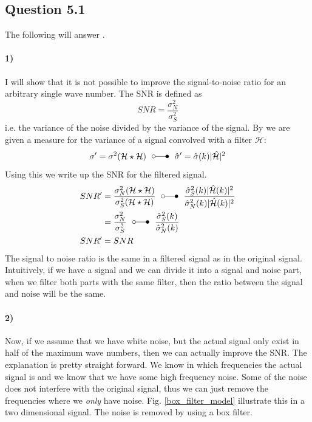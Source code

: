 \documentclass[a4paper, 10pt, final]{article}
\title{\mytitle}
\subtitle{\mysubtitle}
\author{\myauthor{} - \mymail}
\date{\mydate}
\begin{document}
\maketitle

\subsection*{Question 5.1}
The following will answer \citep[Excercise 11.6, p. 329]{jahne-digital}.

\paragraph{1)}
I will show that it is not possible to improve the signal-to-noise ratio
for an arbitrary single wave number. The SNR is defined as
\begin{equation}
    SNR = \frac{\sigma^2_N}{\sigma^2_S}
\end{equation}
i.e. the variance of the noise divided by the variance of the signal. By
\citep[Eq. (4.38)]{jahne-digital} we are given a measure for the
variance of a signal convolved with a filter $\mathcal{H}$:
\begin{equation}
    \mathbf{\sigma'} = \sigma^2(\mathcal{H} \star
    \mathcal{H})~ ~\laplace~ ~
    \mathbf{\hat{\sigma}'} = \hat{\sigma}(k)|\hat{\mathcal{H}}|^2
\end{equation}
Using this we write up the SNR for the filtered signal.
\begin{align}
    SNR' & =
    \frac{\sigma^2_N(\mathcal{H}\star\mathcal{H})}{\sigma^2_S(\mathcal{H}\star\mathcal{H})}
    ~ ~\laplace~
    ~\frac{\hat{\sigma}^2_S(k)|\hat{\mathcal{H}}(k)|^2}{\hat{\sigma}^2_N(k)|\hat{\mathcal{H}}(k)|^2}\\
    & = \frac{\sigma^2_N}{\sigma^2_S}
    ~ ~\laplace~
    ~\frac{\hat{\sigma}^2_S(k)}{\hat{\sigma}^2_N(k)}\\
    SNR' & = SNR
\end{align}
The signal to noise ratio is the same in a filtered signal as in the
original signal. Intuitively, if we have a signal and we can divide it
into a signal and noise part, when we filter both parts with the same
filter, then the ratio between the signal and noise will be the same.

\paragraph{2)}
Now, if we assume that we have white noise, but the actual signal only
exist in half of the maximum wave numbers, then we can actually improve
the SNR. The explanation is pretty straight forward. We know in which
frequencies the actual signal is and we know that we have some high
frequency noise. Some of the noise does not interfere with the original
signal, thus we can just remove the frequencies where we \emph{only}
have noise. Fig. \ref{box_filter_model} illustrate this in a two
dimensional signal. The noise is removed by using a box filter.
\end{document}
